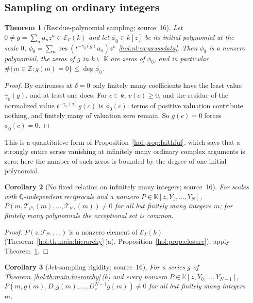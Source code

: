 \documentclass[11pt]{article}
\numberwithin{equation}{section}
\newtheorem{theorem}{Theorem}[section]
\newtheorem{corollary}[theorem]{Corollary}
\theoremstyle{definition}
\theoremstyle{remark}
\newcommand{\Q}{\mathbb Q}
\newcommand{\Z}{\mathbb Z}
\newcommand{\res}{\operatorname{res}}
\newcommand{\KK}{\mathbb K}
\newcommand{\EK}{\mathcal E_\Gamma(k)}
\begin{document}
\subsection{Sampling on ordinary integers}\label{hol:th:sub:sampling}

\begin{theorem}[Residue-polynomial sampling; source~16]
\label{hol:th:thm:sampling}
Let $0\ne g=\sum_na_nz^n\in\EK$ and let $\phi_0\in k[z]$ be its initial
polynomial at the scale $0$, $\phi_0=\sum_n\res(t^{-\gamma_0(g)}a_n)z^n$
\eqref{hol:nl:eq:gaussdata}. Then $\phi_0$ is a nonzero polynomial, the zeros
of $g$ in $k\subseteq\KK$ are zeros of $\phi_0$, and in particular
$\#\{m\in\Z:g(m)=0\}\le\deg\phi_0$.
\end{theorem}

\begin{proof}
By entireness at $\delta=0$ only finitely many coefficients have the least
value $\gamma_0(g)$, and at least one does. For $c\in k$, $v(c)\ge0$, and the
residue of the normalized value $t^{-\gamma_0(g)}g(c)$ is $\phi_0(c)$: terms of
positive valuation contribute nothing, and finitely many of valuation zero
remain. So $g(c)=0$ forces $\phi_0(c)=0$.
\end{proof}

This is a quantitative form of Proposition~\ref{hol:prop:faithful}, which
says that a strongly entire series vanishing at infinitely many ordinary
complex arguments is zero; here the number of such zeros is bounded by the
degree of one initial polynomial.

\begin{corollary}[No fixed relation on infinitely many integers; source~16]
\label{hol:th:cor:samplingrelations}
For scales with $\Q$-independent reciprocals and a nonzero
$P\in\KK[z,Y_1,\ldots,Y_N]$, $P(m,\mathcal T_{t^{\mu_1}}(m),\ldots,
\mathcal T_{t^{\mu_N}}(m))\ne0$ for all but finitely many integers $m$; for
finitely many polynomials the exceptional set is common.
\end{corollary}

\begin{proof}
$P(z,\mathcal T_{t^{\mu_1}},\ldots)$ is a nonzero element of $\EK$
(Theorem~\ref{hol:th:main:hierarchy}\,(a), Proposition~\ref{hol:prop:closure});
apply Theorem~\ref{hol:th:thm:sampling}.
\end{proof}

\begin{corollary}[Jet-sampling rigidity; source~16]
\label{hol:th:cor:jetsampling}
For a series $g$ of Theorem~\ref{hol:th:main:hierarchy}\,(b) and every nonzero
$P\in\KK[z,Y_0,\ldots,Y_{N-1}]$,
$P(m,g(m),D_zg(m),\ldots,D_z^{N-1}g(m))\ne0$ for all but finitely many integers
$m$.
\end{corollary}
\end{document}
